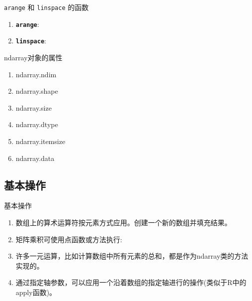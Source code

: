 \documentclass[ignorenonframetext,11pt,xcolor=dvipsnames,hyperref={colorlinks,allcolors=.,urlcolor=blue, citecolor=violet, bookmarksdepth=4},aspectratio=1610]{beamer}
\providecommand{\tightlist}{%
  \setlength{\itemsep}{0pt}\setlength{\parskip}{0pt}}
\newcommand{\passthrough}[1]{#1}
\begin{document}
\begin{frame}[fragile]{\passthrough{\lstinline!arange!} 和
\passthrough{\lstinline!linspace!} 的函数}
\protect\hypertarget{arange--linspace-}{}

\begin{enumerate}
\item
  \textbf{\passthrough{\lstinline!arange!}}:
\item
  \textbf{\passthrough{\lstinline!linspace!}}:
\end{enumerate}

\end{frame}

\begin{frame}{ndarray对象的属性}
\protect\hypertarget{ndarray-1}{}

\begin{enumerate}
\tightlist
\item
  ndarray.ndim
\item
  ndarray.shape
\item
  ndarray.size
\item
  ndarray.dtype
\item
  ndarray.itemsize
\item
  ndarray.data
\end{enumerate}

\end{frame}

\hypertarget{section-6}{%
\subsection{基本操作}\label{section-6}}

\begin{frame}{基本操作}
\protect\hypertarget{section-7}{}

\begin{enumerate}
\tightlist
\item
  数组上的算术运算符按元素方式应用。创建一个新的数组并填充结果。
\item
  矩阵乘积可使用点函数或方法执行:
\item
  许多一元运算，比如计算数组中所有元素的总和，都是作为ndarray类的方法实现的。
\item
  通过指定轴参数，可以应用一个沿着数组的指定轴进行的操作(类似于R中的apply函数)。
\end{enumerate}

\end{frame}
\end{document}
